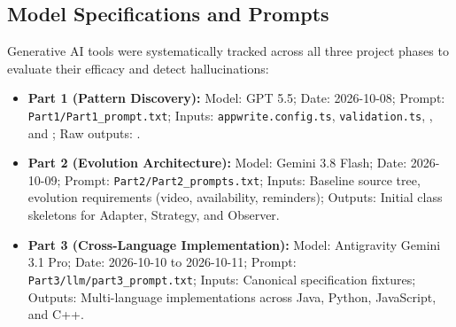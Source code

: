 \documentclass[11pt,a4paper]{article}
\begin{document}
\subsection{Model Specifications and Prompts}
Generative AI tools were systematically tracked across all three project phases to evaluate their efficacy and detect hallucinations:
\begin{itemize}
\item \textbf{Part 1 (Pattern Discovery):} Model: GPT 5.5; Date: 2026-10-08; Prompt: \texttt{Part1/Part1\_prompt.txt}; Inputs: \texttt{appwrite.config.ts}, \texttt{validation.ts}, , and ; Raw outputs: .
\item \textbf{Part 2 (Evolution Architecture):} Model: Gemini 3.8 Flash; Date: 2026-10-09; Prompt: \texttt{Part2/Part2\_prompts.txt}; Inputs: Baseline source tree, evolution requirements (video, availability, reminders); Outputs: Initial class skeletons for Adapter, Strategy, and Observer.
\item \textbf{Part 3 (Cross-Language Implementation):} Model: Antigravity Gemini 3.1 Pro; Date: 2026-10-10 to 2026-10-11; Prompt: \texttt{Part3/llm/part3\_prompt.txt}; Inputs: Canonical specification fixtures; Outputs: Multi-language implementations across Java, Python, JavaScript, and C++.
\end{itemize}
\end{document}
